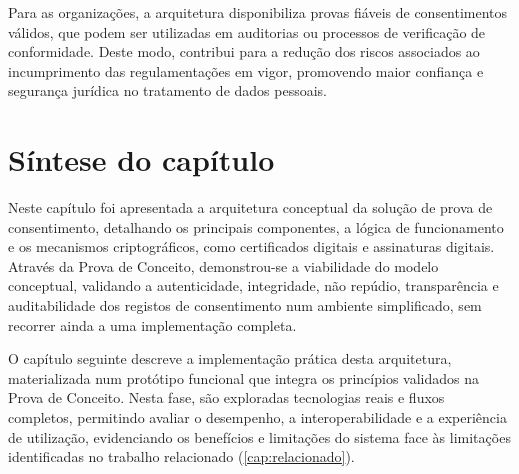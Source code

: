 Para as organizações, a arquitetura disponibiliza provas fiáveis de consentimentos válidos, que podem ser utilizadas em auditorias ou processos de verificação de conformidade.
Deste modo, contribui para a redução dos riscos associados ao incumprimento das regulamentações em vigor, promovendo maior confiança e segurança jurídica no tratamento de dados pessoais.

\section{Síntese do capítulo}

Neste capítulo foi apresentada a arquitetura conceptual da solução de prova de consentimento, detalhando os principais componentes, a lógica de funcionamento e os mecanismos criptográficos, como certificados digitais e assinaturas digitais. Através da Prova de Conceito, demonstrou-se a viabilidade do modelo conceptual, validando a autenticidade, integridade, não repúdio, transparência e auditabilidade dos registos de consentimento num ambiente simplificado, sem recorrer ainda a uma implementação completa.

O capítulo seguinte descreve a implementação prática desta arquitetura, materializada num protótipo funcional que integra os princípios validados na Prova de Conceito. Nesta fase, são exploradas tecnologias reais e fluxos completos, permitindo avaliar o desempenho, a interoperabilidade e a experiência de utilização, evidenciando os benefícios e limitações do sistema face às limitações identificadas no trabalho relacionado (\ref{cap:relacionado}).
